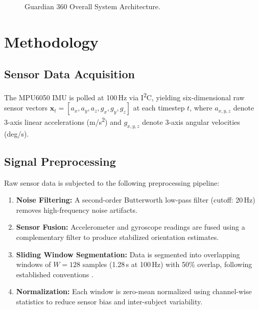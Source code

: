 \documentclass[conference]{IEEEtran}
\begin{document}
\begin{figure}[!t]
\caption{Guardian 360 Overall System Architecture.}
\label{fig:sysarch}
\end{figure}

\section{Methodology}

\subsection{Sensor Data Acquisition}

The MPU6050 IMU is polled at 100\,Hz via I\textsuperscript{2}C, yielding six-dimensional raw sensor vectors $\mathbf{x}_t = [a_x, a_y, a_z, g_x, g_y, g_z]$ at each timestep $t$, where $a_{x,y,z}$ denote 3-axis linear accelerations (m/s\textsuperscript{2}) and $g_{x,y,z}$ denote 3-axis angular velocities (deg/s).

\subsection{Signal Preprocessing}

Raw sensor data is subjected to the following preprocessing pipeline:
\begin{enumerate}
  \item \textbf{Noise Filtering:} A second-order Butterworth low-pass filter (cutoff: 20\,Hz) removes high-frequency noise artifacts.
  \item \textbf{Sensor Fusion:} Accelerometer and gyroscope readings are fused using a complementary filter to produce stabilized orientation estimates.
  \item \textbf{Sliding Window Segmentation:} Data is segmented into overlapping windows of $W = 128$ samples (1.28\,s at 100\,Hz) with 50\% overlap, following established conventions \cite{attal2015}.
  \item \textbf{Normalization:} Each window is zero-mean normalized using channel-wise statistics to reduce sensor bias and inter-subject variability.
\end{enumerate}
\end{document}
